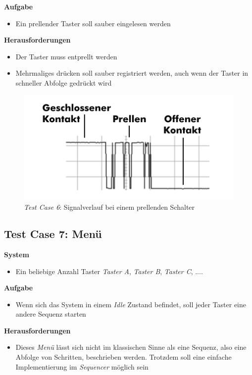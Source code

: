 \textbf{Aufgabe}
\begin{itemize}
\item Ein prellender Taster soll sauber eingelesen werden
\end{itemize}

\textbf{Herausforderungen}
\begin{itemize}
\item Der Taster muss entprellt werden
\item Mehrmaliges drücken soll sauber registriert werden, auch wenn der Taster in schneller Abfolge gedrückt wird
\end{itemize}

\begin{figure}[]
\centering
\includegraphics[angle=0]{images/Testcase06.png}
\caption{\textit{Test Case 6}: Signalverlauf bei einem prellenden Schalter}
\label{Testcase06Picture}
\end{figure}


\subsection{Test Case 7: Menü}
\label{Testcase07}
\textbf{System}
\begin{itemize}
\item Ein beliebige Anzahl Taster \textit{Taster A}, \textit{Taster B}, \textit{Taster C}, ....
\end{itemize}

\textbf{Aufgabe}
\begin{itemize}
\item Wenn sich das System in einem \textit{Idle} Zustand befindet, soll jeder Taster eine andere Sequenz starten
\end{itemize}

\textbf{Herausforderungen}
\begin{itemize}
\item Dieses \textit{Menü} lässt sich nicht im klassischen Sinne als eine Sequenz, also eine Abfolge von Schritten, beschrieben werden. Trotzdem soll eine einfache Implementierung im \textit{Sequencer} möglich sein
\end{itemize}


